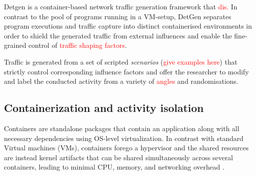 \documentclass[runningheads]{llncs}
\begin{document}
Detgen is a container-based network traffic generation framework that \textcolor{red}{dis.} %
In contrast to the pool of programs running in a VM-setup, DetGen separates program executions and traffic capture into distinct containerised environments in order to shield the generated traffic from external influences and enable the fine-grained control of \textcolor{red}{traffic shaping factors}.

Traffic is generated from a set of scripted \textit{scenarios} (\textcolor{red}{give examples here}) that strictly control corresponding influence factors and offer the researcher to modify and label the conducted activity from a variety of \textcolor{red}{angles} and randomisations. %

\subsection{Containerization and activity isolation}
Containers are standalone packages that contain an application along with all necessary dependencies using OS-level virtualization. In contrast with standard Virtual machines (VMs), containers forego a hypervisor and the shared resources are instead kernel artifacts that can be shared simultaneously across several containers, leading to minimal CPU, memory, and networking overhead \cite{kolyshkin2006virtualization}.
\end{document}
